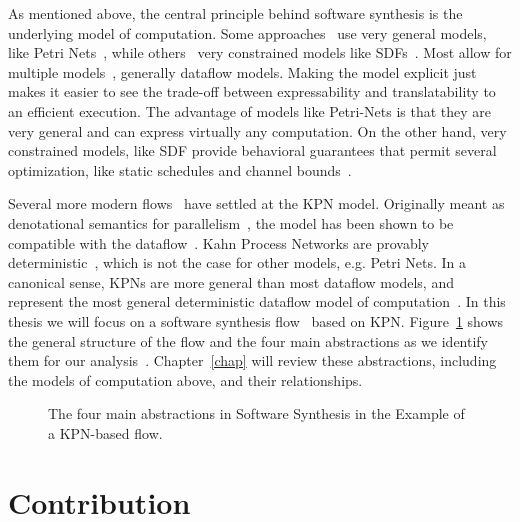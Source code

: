 As mentioned above, the central principle behind software synthesis is the underlying model of computation. 
Some approaches~\cite{lin1998softwaresynthesis} use very general models, like Petri Nets~\cite{petri1962nets}, while others~\cite{ritz1992softwaresynthesis} very constrained models like \acp{SDF}~\cite{lee1987sdf}.
Most allow for multiple models~\cite{bhartacharyya2000softwaresynthesis,pino1995softwaresynthesis,bhattacharyya2012softwaresynthesis}, generally dataflow models.
Making the model explicit just makes it easier to see the trade-off between expressability and translatability to an efficient execution.
The advantage of models like Petri-Nets is that they are very general and can express virtually any computation.
On the other hand, very constrained models, like \ac{SDF} provide behavioral guarantees that permit several optimization, like static schedules and channel bounds~\cite{Parks:M95/105}.

Several more modern flows~\cite{thiele2007DOL,maps,pimentel2006systematic,kangas2006uml} have settled at the \ac{KPN} model.
Originally meant as denotational semantics for parallelism~\cite{kahn74}, the model has been shown to be compatible with the dataflow~\cite{lee1995dataflow}.
Kahn Process Networks are provably deterministic~\cite{kahn74}, which is not the case for other models, e.g. Petri Nets.
In a canonical sense, \acp{KPN} are more general than most dataflow models, and represent the most general deterministic dataflow model of computation~\cite{lee_matsikoudis_semantics}.
In this thesis we will focus on a software synthesis flow~\cite{maps,castrillon2014thesis} based on \ac{KPN}.
Figure~\ref{fig:software_synthesis_flows} shows the general structure of the flow and the four main abstractions as we identify them for our analysis~\cite{goens_mcsoc16}.
Chapter~\ref{chap} will review these abstractions, including the models of computation above, and their relationships.

\begin{figure}[h]
	\centering
   \resizebox{0.75\textwidth}{!}{}
   \caption{The four main abstractions in Software Synthesis in the Example of a \acs{KPN}-based flow.} 
	\label{fig:software_synthesis_flows}
\end{figure}

\section{Contribution}

